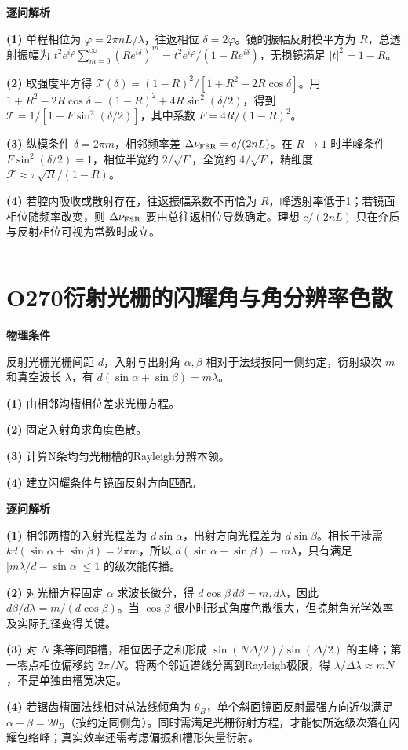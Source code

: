 \documentclass[UTF8,a4paper,11pt,oneside,openany]{ctexbook}
\begin{document}
\par\medskip\noindent\textbf{逐问解析}
\par\noindent\textbf{(1)} 单程相位为 \(\varphi=2\pi nL/\lambda\)，往返相位 \(\delta=2\varphi\)。镜的振幅反射模平方为 \(R\)，总透射振幅为 \(t^2 e^{i\varphi}\sum_{m=0}^{\infty}(Re^{i\delta})^m=t^2e^{i\varphi}/(1-Re^{i\delta})\)，无损镜满足 \(|t|^2=1-R\)。
\par\noindent\textbf{(2)} 取强度平方得 \(\mathcal T(\delta)=(1-R)^2/[1+R^2-2R\cos\delta]\)。用 \(1+R^2-2R\cos\delta=(1-R)^2+4R\sin^2(\delta/2)\)，得到 \(\mathcal T=1/[1+F\sin^2(\delta/2)]\)，其中系数 \(F=4R/(1-R)^2\)。
\par\noindent\textbf{(3)} 纵模条件 \(\delta=2\pi m\)，相邻频率差 \(\Delta\nu_{\rm FSR}=c/(2nL)\)。在 \(R\to1\) 时半峰条件 \(F\sin^2(\delta/2)=1\)，相位半宽约 \(2/\sqrt F\)，全宽约 \(4/\sqrt F\)，精细度 \(\mathcal F\approx\pi\sqrt R/(1-R)\)。
\par\noindent\textbf{(4)} 若腔内吸收或散射存在，往返振幅系数不再恰为 \(R\)，峰透射率低于1；若镜面相位随频率改变，则 \(\Delta\nu_{\rm FSR}\) 要由总往返相位导数确定。理想 \(c/(2nL)\) 只在介质与反射相位可视为常数时成立。

\par\bigskip\hrule\bigskip
\section*{O270\quad 衍射光栅的闪耀角与角分辨率色散}
\textbf{物理条件}\par 反射光栅光栅间距 \(d\)，入射与出射角 \(\alpha,\beta\) 相对于法线按同一侧约定，衍射级次 \(m\) 和真空波长 \(\lambda\)，有 \(d(\sin\alpha+\sin\beta)=m\lambda\)。
\par\noindent\textbf{(1)} 由相邻沟槽相位差求光栅方程。
\par\noindent\textbf{(2)} 固定入射角求角度色散。
\par\noindent\textbf{(3)} 计算N条均匀光栅槽的Rayleigh分辨本领。
\par\noindent\textbf{(4)} 建立闪耀条件与镜面反射方向匹配。

\par\medskip\noindent\textbf{逐问解析}
\par\noindent\textbf{(1)} 相邻两槽的入射光程差为 \(d\sin\alpha\)，出射方向光程差为 \(d\sin\beta\)。相长干涉需 \(k d(\sin\alpha+\sin\beta)=2\pi m\)，所以 \(d(\sin\alpha+\sin\beta)=m\lambda\)，只有满足 \(|m\lambda/d-\sin\alpha|\le1\) 的级次能传播。
\par\noindent\textbf{(2)} 对光栅方程固定 \(\alpha\) 求波长微分，得 \(d\cos\beta\,d\beta=m,d\lambda\)，因此 \(d\beta/d\lambda=m/(d\cos\beta)\)。当 \(\cos\beta\) 很小时形式角度色散很大，但掠射角光学效率及实际孔径变得关键。
\par\noindent\textbf{(3)} 对 \(N\) 条等间距槽，相位因子之和形成 \(\sin(N\Delta/2)/\sin(\Delta/2)\) 的主峰；第一零点相位偏移约 \(2\pi/N\)。将两个邻近谱线分离到Rayleigh极限，得 \(\lambda/\Delta\lambda\approx mN\)，不是单独由槽宽决定。
\par\noindent\textbf{(4)} 若锯齿槽面法线相对总法线倾角为 \(\theta_B\)，单个斜面镜面反射最强方向近似满足 \(\alpha+\beta=2\theta_B\)（按约定同侧角）。同时需满足光栅衍射方程，才能使所选级次落在闪耀包络峰；真实效率还需考虑偏振和槽形矢量衍射。
\end{document}
